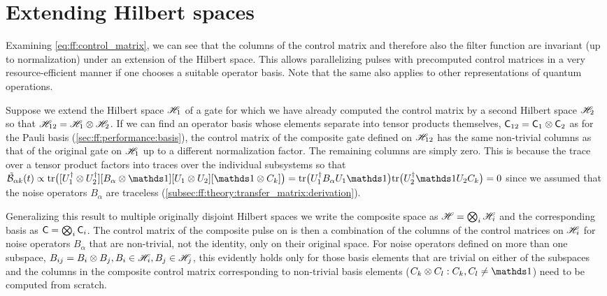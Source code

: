 \section{Extending Hilbert spaces}\label{sec:ff:performance:extending_hilbert_spaces}
Examining \cref{eq:ff:control_matrix}, we can see that the columns of the control matrix and therefore also the filter function are invariant (up to normalization) under an extension of the Hilbert space.
This allows parallelizing pulses with precomputed control matrices in a very resource-efficient manner if one chooses a suitable operator basis.
Note that the same also applies to other representations of quantum operations.

Suppose we extend the Hilbert space $\mathscr{H}_1$ of a gate for which we have already computed the control matrix by a second Hilbert space $\mathscr{H}_2$ so that $\mathscr{H}_{12} = \mathscr{H}_1\otimes\mathscr{H}_2$.
If we can find an operator basis whose elements separate into tensor products themselves, \ie $\mathsf{C}_{12} = \mathsf{C}_1\otimes\mathsf{C}_2$ as for the Pauli basis (\cf \cref{sec:ff:performance:basis}), the control matrix of the composite gate defined on $\mathscr{H}_{12}$ has the same non-trivial columns as that of the original gate on $\mathscr{H}_1$ up to a different normalization factor.
The remaining columns are simply zero.
This is because the trace over a tensor product factors into traces over the individual subsystems so that $\ctrlmat_{\alpha k}(t)\propto\mr{tr}\bigl([U_1\adjoint\otimes U_2\adjoint][B_\alpha\otimes\eye][U_1\otimes U_2][\eye\otimes C_k]\bigr) = \mr{tr}\bigl(U_1\adjoint B_\alpha U_1\eye\bigr)\mr{tr}\bigl(U_2\adjoint\eye U_2 C_k\bigr) = 0$ since we assumed that the noise operators $B_\alpha$ are traceless (\cf \cref{subsec:ff:theory:transfer_matrix:derivation}).

Generalizing this result to multiple originally disjoint Hilbert spaces we write the composite space as $\mathscr{H} = \bigotimes_i\mathscr{H}_i$ and the corresponding basis as $\mathsf{C} = \bigotimes_i\mathsf{C}_i$.
The control matrix of the composite pulse on \Hspace is then a combination of the columns of the control matrices on $\mathscr{H}_i$ for noise operators $B_\alpha$ that are non-trivial, \ie not the identity, only on their original space.
For noise operators defined on more than one subspace, \eg $B_{ij} = B_i\otimes B_j, B_i\in\mathscr{H}_i, B_j\in\mathscr{H}_j$, this evidently holds only for those basis elements that are trivial on either of the subspaces and the columns in the composite control matrix corresponding to non-trivial basis elements ($C_k\otimes C_l: C_k,C_l\neq\eye$) need to be computed from scratch.

